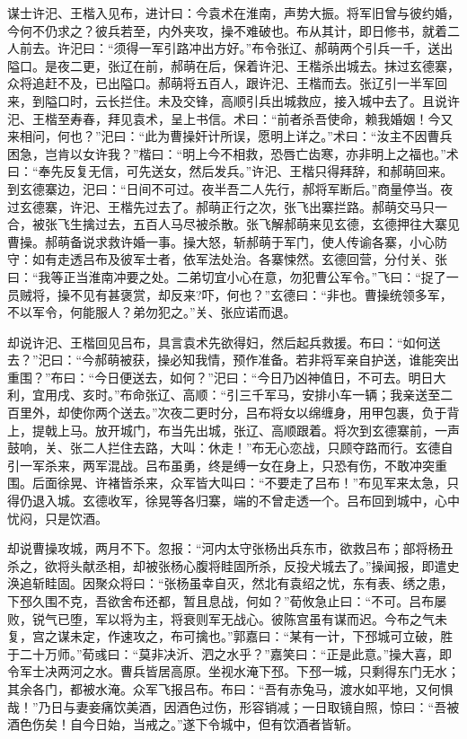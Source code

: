 谋士许汜、王楷入见布，进计曰：今袁术在淮南，声势大振。将军旧曾与彼约婚，今何不仍求之？彼兵若至，内外夹攻，操不难破也。布从其计，即日修书，就着二人前去。许汜曰：“须得一军引路冲出方好。”布令张辽、郝萌两个引兵一千，送出隘口。是夜二更，张辽在前，郝萌在后，保着许汜、王楷杀出城去。抹过玄德寨，众将追赶不及，已出隘口。郝萌将五百人，跟许汜、王楷而去。张辽引一半军回来，到隘口时，云长拦住。未及交锋，高顺引兵出城救应，接入城中去了。且说许汜、王楷至寿春，拜见袁术，呈上书信。术曰：“前者杀吾使命，赖我婚姻！今又来相问，何也？”汜曰：“此为曹操奸计所误，愿明上详之。”术曰：“汝主不因曹兵困急，岂肯以女许我？”楷曰：“明上今不相救，恐唇亡齿寒，亦非明上之福也。”术曰：“奉先反复无信，可先送女，然后发兵。”许汜、王楷只得拜辞，和郝萌回来。到玄德寨边，汜曰：“日间不可过。夜半吾二人先行，郝将军断后。”商量停当。夜过玄德寨，许汜、王楷先过去了。郝萌正行之次，张飞出寨拦路。郝萌交马只一合，被张飞生擒过去，五百人马尽被杀散。张飞解郝萌来见玄德，玄德押往大寨见曹操。郝萌备说求救许婚一事。操大怒，斩郝萌于军门，使人传谕各寨，小心防守：如有走透吕布及彼军士者，依军法处治。各寨悚然。玄德回营，分付关、张曰：“我等正当淮南冲要之处。二弟切宜小心在意，勿犯曹公军令。”飞曰：“捉了一员贼将，操不见有甚褒赏，却反来?吓，何也？”玄德曰：“非也。曹操统领多军，不以军令，何能服人？弟勿犯之。”关、张应诺而退。

却说许汜、王楷回见吕布，具言袁术先欲得妇，然后起兵救援。布曰：“如何送去？”汜曰：“今郝萌被获，操必知我情，预作准备。若非将军亲自护送，谁能突出重围？”布曰：“今日便送去，如何？”汜曰：“今日乃凶神值日，不可去。明日大利，宜用戌、亥时。”布命张辽、高顺：“引三千军马，安排小车一辆；我亲送至二百里外，却使你两个送去。”次夜二更时分，吕布将女以绵缠身，用甲包裹，负于背上，提戟上马。放开城门，布当先出城，张辽、高顺跟着。将次到玄德寨前，一声鼓响，关、张二人拦住去路，大叫：休走！”布无心恋战，只顾夺路而行。玄德自引一军杀来，两军混战。吕布虽勇，终是缚一女在身上，只恐有伤，不敢冲突重围。后面徐晃、许褚皆杀来，众军皆大叫曰：“不要走了吕布！”布见军来太急，只得仍退入城。玄德收军，徐晃等各归寨，端的不曾走透一个。吕布回到城中，心中忧闷，只是饮酒。

却说曹操攻城，两月不下。忽报：“河内太守张杨出兵东市，欲救吕布；部将杨丑杀之，欲将头献丞相，却被张杨心腹将眭固所杀，反投犬城去了。”操闻报，即遣史涣追斩眭固。因聚众将曰：“张杨虽幸自灭，然北有袁绍之忧，东有表、绣之患，下邳久围不克，吾欲舍布还都，暂且息战，何如？”荀攸急止曰：“不可。吕布屡败，锐气已堕，军以将为主，将衰则军无战心。彼陈宫虽有谋而迟。今布之气未复，宫之谋未定，作速攻之，布可擒也。”郭嘉曰：“某有一计，下邳城可立破，胜于二十万师。”荀彧曰：“莫非决沂、泗之水乎？”嘉笑曰：“正是此意。”操大喜，即令军士决两河之水。曹兵皆居高原。坐视水淹下邳。下邳一城，只剩得东门无水；其余各门，都被水淹。众军飞报吕布。布曰：“吾有赤兔马，渡水如平地，又何惧哉！”乃日与妻妾痛饮美酒，因酒色过伤，形容销减；一日取镜自照，惊曰：“吾被酒色伤矣！自今日始，当戒之。”遂下令城中，但有饮酒者皆斩。

